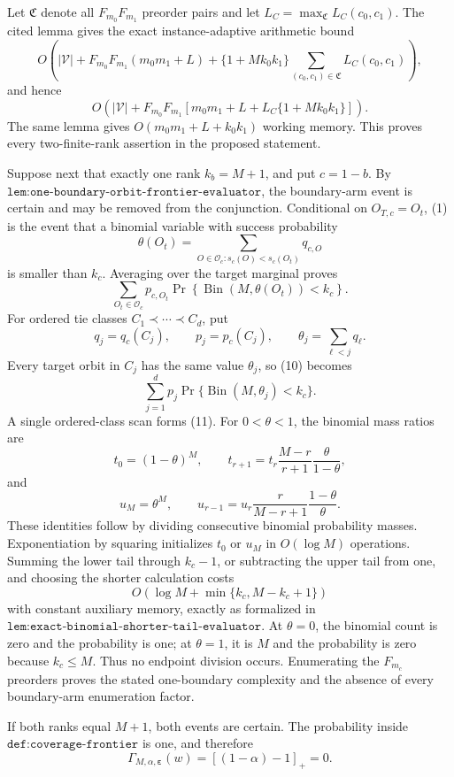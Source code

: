 Let \(\mathfrak C\) denote all \(F_{m_0}F_{m_1}\) preorder pairs and let \(L_C=\max_{\mathfrak C}L_C(c_0,c_1)\). The cited lemma gives the exact instance-adaptive arithmetic bound
\[
O\!\left(
|\mathcal V|+F_{m_0}F_{m_1}(m_0m_1+L)
+\{1+Mk_0k_1\}
\sum_{(c_0,c_1)\in\mathfrak C}L_C(c_0,c_1)
\right),
\tag{7}
\]
and hence
\[
O\!\left(|\mathcal V|+F_{m_0}F_{m_1}
\left[m_0m_1+L+L_C\{1+Mk_0k_1\}\right]\right).
\tag{8}
\]
The same lemma gives \(O(m_0m_1+L+k_0k_1)\) working memory. This proves every two-finite-rank assertion in the proposed statement.

Suppose next that exactly one rank \(k_b=M+1\), and put \(c=1-b\). By \(\texttt{lem:one-boundary-orbit-frontier-evaluator}\), the boundary-arm event is certain and may be removed from the conjunction. Conditional on \(O_{T,c}=O_t\), (1) is the event that a binomial variable with success probability
\[
\theta(O_t)=\sum_{O\in\mathcal O_c:s_c(O)<s_c(O_t)}q_{c,O}
\tag{9}
\]
is smaller than \(k_c\). Averaging over the target marginal proves
\[
\sum_{O_t\in\mathcal O_c}p_{c,O_t}
\Pr\!\left\{\operatorname{Bin}(M,\theta(O_t))<k_c\right\}.
\tag{10}
\]
For ordered tie classes \(C_1\prec\cdots\prec C_d\), put
\[
q_j=q_c(C_j),\qquad p_j=p_c(C_j),\qquad
\theta_j=\sum_{\ell<j}q_\ell.
\tag{11}
\]
Every target orbit in \(C_j\) has the same value \(\theta_j\), so (10) becomes
\[
\sum_{j=1}^d p_j\Pr\{\operatorname{Bin}(M,\theta_j)<k_c\}.
\tag{12}
\]
A single ordered-class scan forms (11). For \(0<\theta<1\), the binomial mass ratios are
\[
t_0=(1-\theta)^M,\qquad
t_{r+1}=t_r\frac{M-r}{r+1}\frac{\theta}{1-\theta},
\tag{13}
\]
and
\[
u_M=\theta^M,\qquad
u_{r-1}=u_r\frac{r}{M-r+1}\frac{1-\theta}{\theta}.
\tag{14}
\]
These identities follow by dividing consecutive binomial probability masses. Exponentiation by squaring initializes \(t_0\) or \(u_M\) in \(O(\log M)\) operations. Summing the lower tail through \(k_c-1\), or subtracting the upper tail from one, and choosing the shorter calculation costs
\[
O\!\left(\log M+\min\{k_c,M-k_c+1\}\right)
\tag{15}
\]
with constant auxiliary memory, exactly as formalized in \(\texttt{lem:exact-binomial-shorter-tail-evaluator}\). At \(\theta=0\), the binomial count is zero and the probability is one; at \(\theta=1\), it is \(M\) and the probability is zero because \(k_c\le M\). Thus no endpoint division occurs. Enumerating the \(F_{m_c}\) preorders proves the stated one-boundary complexity and the absence of every boundary-arm enumeration factor.

If both ranks equal \(M+1\), both events are certain. The probability inside \(\texttt{def:coverage-frontier}\) is one, and therefore
\[
\Gamma_{M,\alpha,\boldsymbol\varepsilon}(w)=[(1-\alpha)-1]_+=0.
\tag{16}
\]

